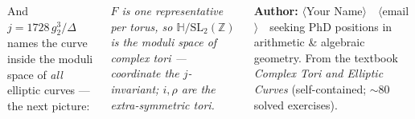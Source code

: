 \documentclass[25pt, a0paper, portrait, margin=14mm, innermargin=15mm,
               blockverticalspace=12mm, colspace=16mm, subcolspace=8mm]{tikzposter}
\newcommand{\Z}{\mathbb{Z}}
\newcommand{\HH}{\mathbb{H}}
\newcommand{\figH}[2]{\par\smallskip{\centering\resizebox{!}{#1}{#2}\par}\smallskip}
\newcommand{\figcap}[1]{{\centering\small\itshape #1\par}\smallskip}
\begin{document}
\begin{columns}
{\par\smallskip
And $j=1728\,g_2^3/\Delta$ names the curve inside the moduli space of \emph{all} elliptic
curves --- the next picture:
\figH{172pt}{}
\figcap{$F$ is one representative per torus, so $\HH/\mathrm{SL}_2(\Z)$ is the moduli space
of complex tori --- coordinate the $j$-invariant; $i,\rho$ are the extra-symmetric tori.}
\par\smallskip
{\footnotesize\textbf{Author:} \(\langle\)Your Name\(\rangle\) \,\textbullet\,
\(\langle\)email\(\rangle\) \,\textbullet\, seeking PhD positions in arithmetic \& algebraic
geometry. \;From the textbook \emph{Complex Tori and Elliptic Curves} (self-contained;
${\sim}80$ solved exercises).}}

\end{columns}
\end{document}
